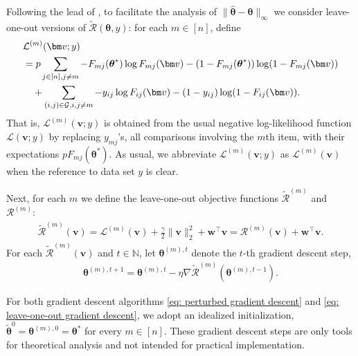 \documentclass[letterpaper,12pt]{article}
\numberwithin{equation}{section}
\theoremstyle{plain}
\numberwithin{Theorem}{section}
\numberwithin{corollary}{section}
\numberwithin{proposition}{section}
\numberwithin{Lemma}{section}
{
	\theoremstyle{definition}
	\newtheorem{Definition}{Definition}
	\newtheorem{example}{Example}
	\numberwithin{example}{section}
	\newtheorem{fact}{Fact}
	\numberwithin{fact}{section}
	\newtheorem{remark}{Remark}
}
\newcommand{\1}{\mathbbm{1}}
\def\bth{{\boldsymbol{\theta}}}
\begin{document}
Following the lead of \cite{chen2019spectral}, to facilitate the analysis of $\|\hat\bth - \bth\|_\infty$ we consider leave-one-out versions of $\widetilde {\mathcal R}(\bth, y)$: for each $m \in [n]$, define
\begin{align}
	&\mathcal L^{(m)}(\bm v; y)   \notag\\
	&= p\sum_{j \in [n], j \neq m} -F_{mj}(\bth^*) \log F_{mj}(\bm v) - (1 - F_{mj}(\bth^*))\log(1 -  F_{mj}(\bm v))\notag\\
	&\quad + \sum_{(i, j) \in \mathcal G, i, j \neq m} -y_{ij}\log F_{ij}(\bm v) - (1-y_{ij})\log(1 - F_{ij}(\bm v)). \label{eq: leave-one-out likelihood}
\end{align}
That is, $\mathcal L^{(m)}(\bm v; y)$ is obtained from the usual negative log-likelihood function $\mathcal L(\bm v; y)$ by replacing $y_{mj}$'s, all comparisons involving the $m$th item, with their expectations $p F_{mj}(\bth^*)$. As usual, we abbreviate $\mathcal L^{(m)}(\bm v; y)$ as $\mathcal L^{(m)}(\bm v)$ when the reference to data set $y$ is clear.

Next, for each $m$ we define the leave-one-out objective functions $\widetilde{\mathcal R}^{(m)}$ and ${\mathcal R}^{(m)}$:
\begin{align}\label{eq: leave-one-out objective}
	\widetilde{\mathcal R}^{(m)}(\bm v) = \mathcal L^{(m)}(\bm v) + \frac{\gamma}{2}\|\bm v\|_2^2 + \bm w^\top \bm v = {\mathcal R}^{(m)}(\bm v) +\bm  w^\top \bm v.
\end{align}
For each $\widetilde{\mathcal R}^{(m)}(\bm v)$ and $t \in \mathbb N$, let $\bth^{(m), t}$ denote the $t$-th gradient descent step,
\begin{align}\label{eq: leave-one-out gradient descent}
	\bth^{(m), t+1} = \bth^{(m), t} - \eta \nabla\widetilde{\mathcal R}^{(m)}(\bth^{(m), t-1}).
\end{align}

For both gradient descent algorithms \eqref{eq: perturbed gradient descent} and \eqref{eq: leave-one-out gradient descent}, we adopt an idealized initialization, $\widetilde \bth^0 = \bth^{(m), 0} = \bth^*$ for every $m \in [n]$. These gradient descent steps are only tools for theoretical analysis and not intended for practical implementation.
\end{document}
